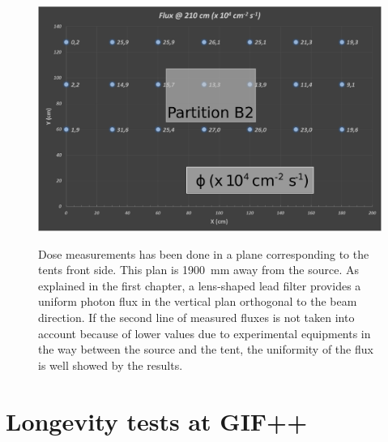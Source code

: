 			\begin{figure}[!h]
				\begin{center}
					\includegraphics[width = \plotwidth]{fig/GIF-fluxes.pdf}\\
					\caption{\label{fig:Dose} Dose measurements has been done in a plane corresponding to the tents front side. This plan is \SI{1900}{\mm} away from the source. As explained in the first chapter, a lens-shaped lead filter provides a uniform photon flux in the vertical plan orthogonal to the beam direction. If the second line of measured fluxes is not taken into account because of lower values due to experimental equipments in the way between the source and the tent, the uniformity of the flux is well showed by the results.}
				\end{center}
			\end{figure}

\newpage

\section{Longevity tests at \acs{GIF++}}
\label{sec:GIFtests}

